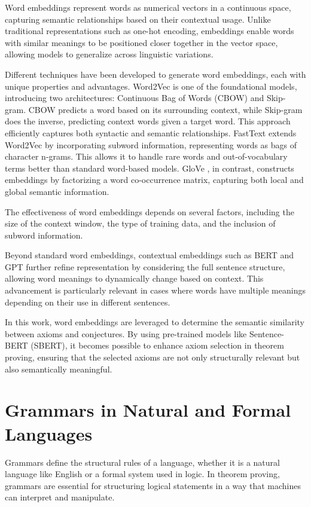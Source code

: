 \documentclass[english,version-2020-11]{uzl-thesis}
\begin{document}
Word embeddings represent words as numerical vectors in a continuous space, capturing semantic relationships based on their contextual usage. Unlike traditional representations such as one-hot encoding, embeddings enable words with similar meanings to be positioned closer together in the vector space, allowing models to generalize across linguistic variations. 

Different techniques have been developed to generate word embeddings, each with unique properties and advantages. Word2Vec \cite{Mikolov2013} is one of the foundational models, introducing two architectures: Continuous Bag of Words (CBOW) and Skip-gram. CBOW predicts a word based on its surrounding context, while Skip-gram does the inverse, predicting context words given a target word. This approach efficiently captures both syntactic and semantic relationships. FastText \cite{Bojanowski2017} extends Word2Vec by incorporating subword information, representing words as bags of character n-grams. This allows it to handle rare words and out-of-vocabulary terms better than standard word-based models. GloVe \cite{Pennington2014}, in contrast, constructs embeddings by factorizing a word co-occurrence matrix, capturing both local and global semantic information.

The effectiveness of word embeddings depends on several factors, including the size of the context window, the type of training data, and the inclusion of subword information.

Beyond standard word embeddings, contextual embeddings such as BERT and GPT \cite{Devlin2019} further refine representation by considering the full sentence structure, allowing word meanings to dynamically change based on context. This advancement is particularly relevant in cases where words have multiple meanings depending on their use in different sentences.

In this work, word embeddings are leveraged to determine the semantic similarity between axioms and conjectures. By using pre-trained models like Sentence-BERT (SBERT), it becomes possible to enhance axiom selection in theorem proving, ensuring that the selected axioms are not only structurally relevant but also semantically meaningful.

\section{Grammars in Natural and Formal Languages}

Grammars define the structural rules of a language, whether it is a natural language like English or a formal system used in logic. In theorem proving, grammars are essential for structuring logical statements in a way that machines can interpret and manipulate.
\end{document}
